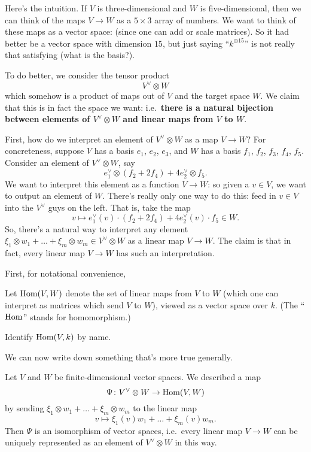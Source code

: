 Here's the intuition.
If $V$ is three-dimensional and $W$ is five-dimensional, then we can think
of the maps $V \to W$ as a $5 \times 3$ array of numbers.
We want to think of these maps as a vector space:
(since one can add or scale matrices).
So it had better be a vector space with dimension $15$,
but just saying ``$k^{\oplus 15}$'' is not really that satisfying
(what is the basis?).

To do better, we consider the tensor product
\[ V^\vee \otimes W \]
which somehow is a product of maps out of $V$ and the target space $W$.
We claim that this is in fact the space we want:
i.e.\ \textbf{there is a natural bijection between elements of $V^\vee \otimes W$
and linear maps from $V$ to $W$}.

First, how do we interpret an element of $V^\vee \otimes W$ as a map $V \to W$?
For concreteness, suppose $V$ has a basis $e_1$, $e_2$, $e_3$,
and $W$ has a basis $f_1$, $f_2$, $f_3$, $f_4$, $f_5$.
Consider an element of $V^\vee \otimes W$, say
\[ e_1^\vee \otimes (f_2 + 2f_4) + 4e_2^\vee \otimes f_5. \]
We want to interpret this element as a function $V \to W$:
so given a $v \in V$,
we want to output an element of $W$.
There's really only one way to do this:
feed in $v \in V$ into the $V^\vee$ guys on the left.
That is, take the map
\[ v \mapsto e_1^\vee(v) \cdot (f_2 + 2f_4) + 4e_2^\vee(v) \cdot f_5 \in W. \]
So, there's a natural way to interpret any element
$\xi_1 \otimes w_1 + \dots + \xi_m \otimes w_m \in V^\vee \otimes W$
as a linear map $V \to W$.
The claim is that in fact, every linear map $V \to W$ has
such an interpretation.

First, for notational convenience,
\begin{definition}
	Let $\operatorname{Hom}(V,W)$ denote the set of linear maps from $V$ to $W$
	(which one can interpret as matrices which send $V$ to $W$),
	viewed as a vector space over $k$.
	(The ``$\operatorname{Hom}$'' stands for homomorphism.)
\end{definition}
\begin{ques}
	Identify $\operatorname{Hom}(V,k)$ by name.
\end{ques}

We can now write down something that's more true generally.
\begin{theorem}
	\label{thm:vect_hom_dualization}
	Let $V$ and $W$ be finite-dimensional vector spaces.
	We described a map
	\[ \Psi \colon V^\vee \otimes W \to \operatorname{Hom}(V,W) \]
	by sending $\xi_1 \otimes w_1 + \dots + \xi_m \otimes w_m$ to the linear map
	\[ v \mapsto \xi_1(v) w_1 + \dots + \xi_m(v) w_m. \]
	Then $\Psi$ is an isomorphism of vector spaces, i.e.\ every linear map $V \to W$
	can be uniquely represented as an element of $V^\vee \otimes W$ in this way.
\end{theorem}

